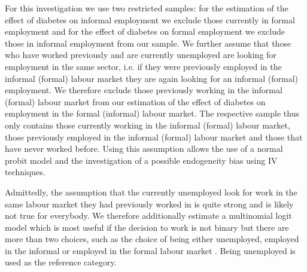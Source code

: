For this investigation we use two restricted samples: for the estimation
of the effect of diabetes on informal employment we exclude those
currently in formal employment and for the effect of diabetes on formal
employment we exclude those in informal employment from our sample.
We further assume that those who have worked previously and are currently
unemployed are looking for employment in the same sector, i.e. if
they were previously employed in the informal (formal) labour market
they are again looking for an informal (formal) employment. We therefore
exclude those previously working in the informal (formal) labour market
from our estimation of the effect of diabetes on employment in the
formal (informal) labour market. The respective sample thus only contains
those currently working in the informal (formal) labour market, those
previously employed in the informal (formal) labour market and those
that have never worked before. Using this assumption allows the use
of a normal probit model and the investigation of a possible endogeneity
bias using \ac{IV} techniques. 


Admittedly, the assumption that the currently unemployed look for
work in the same labour market they had previously worked in is quite
strong and is likely not true for everybody. We therefore additionally
estimate a multinomial logit model which is most useful if the decision
to work is not binary but there are more than two choices, such as
the choice of being either unemployed, employed in the informal or
employed in the formal labour market \parencite{Wooldridge2002}. Being
unemployed is used as the reference category.

